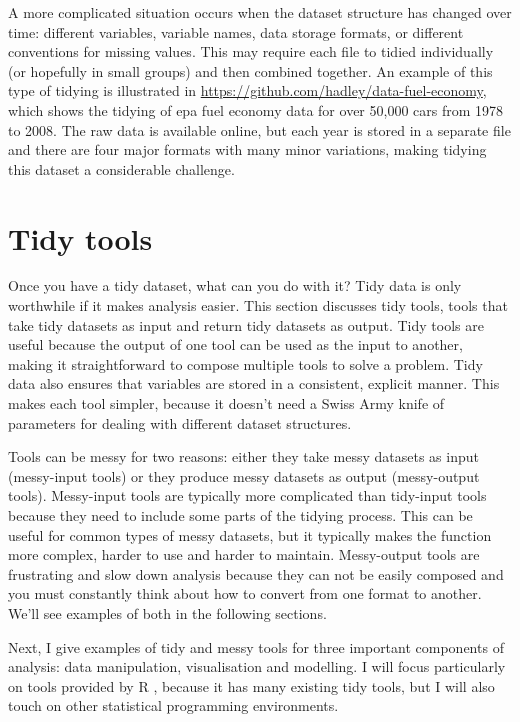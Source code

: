 \documentclass[article]{jss}
\begin{document}
A more complicated situation occurs when the dataset structure has changed over time: different variables, variable names, data storage formats, or different conventions for missing values. This may require each file to tidied individually (or hopefully in small groups) and then combined together. An example of this type of tidying is illustrated in \url{https://github.com/hadley/data-fuel-economy}, which shows the tidying of {\sc epa} fuel economy data for over 50,000 cars from 1978 to 2008. The raw data is available online, but each year is stored in a separate file and there are four major formats with many minor variations, making tidying this dataset a considerable challenge.

\section{Tidy tools}
\label{sec:tidy-tools}

Once you have a tidy dataset, what can you do with it? Tidy data is only worthwhile if it makes analysis easier. This section discusses tidy tools, tools that take tidy datasets as input and return tidy datasets as output. Tidy tools are useful because the output of one tool can be used as the input to another, making it straightforward to compose multiple tools to solve a problem. Tidy data also ensures that variables are stored in a consistent, explicit manner. This makes each tool simpler, because it doesn't need a Swiss Army knife of parameters for dealing with different dataset structures.

Tools can be messy for two reasons: either they take messy datasets as input (messy-input tools) or they produce messy datasets as output (messy-output tools). Messy-input tools are typically more complicated than tidy-input tools because they need to include some parts of the tidying process. This can be useful for common types of messy datasets, but it typically makes the function more complex, harder to use and harder to maintain. Messy-output tools are frustrating and slow down analysis because they can not be easily composed and you must constantly think about how to convert from one format to another. We'll see examples of both in the following sections.

Next, I give examples of tidy and messy tools for three important components of analysis: data manipulation, visualisation and modelling. I will focus particularly on tools provided by R \citep{R}, because it has many existing tidy tools, but I will also touch on other statistical programming environments.
\end{document}
